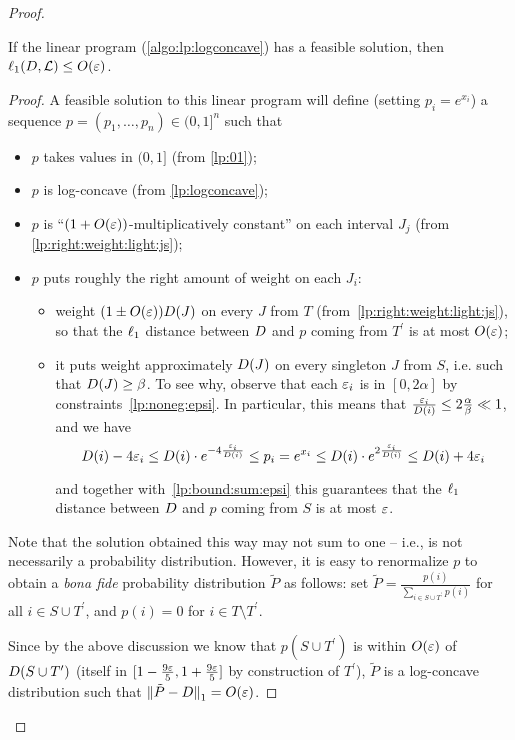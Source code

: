 \begin{proof}
\begin{lemma}[Soundness]\label{lemma:lp:logconcave:soundness}
If the linear program (\cref{algo:lp:logconcave}) has a feasible solution, then $\lp[1](\D, \classlog)\leq \bigO{\eps}$.
\end{lemma}
\begin{proof}
\noindent A feasible solution to this linear program will define (setting $p_i=e^{x_i}$) a sequence $p=(p_1,\dots,p_n) \in (0,1]^n$ such that
\begin{itemize}
  \item $p$ takes values in $(0,1]$ (from \eqref{lp:01});
  \item $p$ is log-concave (from \eqref{lp:logconcave});
  \item $p$ is ``$(1+O(\eps))$-multiplicatively constant'' on each interval $J_j$ (from \eqref{lp:right:weight:light:js});
  \item $p$ puts roughly the right amount of weight on each $J_i$:
    \begin{itemize}
      \item weight $(1\pm O(\eps))\D(J)$ on every $J$ from $T$ (from~\eqref{lp:right:weight:light:js}), so that the $\lp[1]$ distance between $\D$ and $p$ coming from $T^\prime$ is at most $O(\eps)$;
      \item it puts weight approximately $\D(J)$ on every singleton $J$ from $S$, i.e. such that $\D(J) \geq \beta$. To see why, observe that each $\eps_i$ is in $[0,2\alpha]$ by constraints~\eqref{lp:noneg:epsi}. In particular, this means that $\frac{\eps_i}{\D(i)} \leq 2\frac{\alpha}{\beta} \ll 1$, and 
      we have
      \[
           \D(i) - 4\eps_i \leq \D(i)\cdot e^{-4\frac{\eps_i}{\D(i)}} \leq p_i = e^{x_i} \leq \D(i)\cdot e^{2\frac{\eps_i}{\D(i)}} \leq \D(i)+4\eps_i
      \]
      
       and together with~\eqref{lp:bound:sum:epsi} this guarantees that the $\lp[1]$ distance between $\D$ and $p$ coming from $S$ is at most $\eps$.
    \end{itemize}
\end{itemize}
Note that the solution obtained this way may not sum to one -- i.e., is not necessarily a probability distribution. However, it is easy to renormalize $p$ to obtain a \emph{bona fide} probability distribution $\tilde{P}$ as follows: set $\tilde{P} = \frac{p(i)}{\sum_{i\in S\cup T^\prime} p(i)}$ for all $i\in S\cup T^\prime$, and $p(i) =0$ for $i\in T\setminus T^\prime$.

Since by the above discussion we know that $p(S\cup T^\prime)$ is within $\bigO{\eps}$ of $\D(S\cup T^\prime)$ (itself in $[1-\frac{9\eps}{5}, 1+\frac{9\eps}{5}]$ by construction of $T^\prime$), $\tilde{P}$ is a log-concave distribution such that $\normone{\tilde{P}-\D} = \bigO{\eps}$.
\end{proof}


\end{proof}
